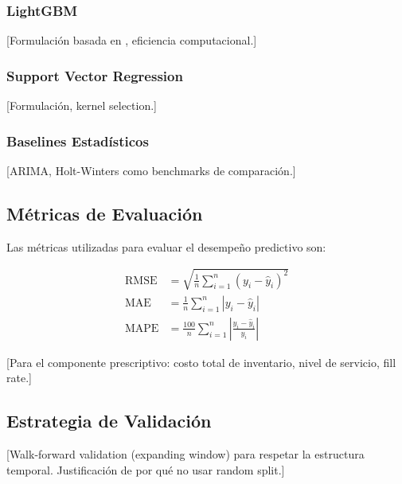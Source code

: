 \subsubsection{LightGBM}
[Formulaci\'{o}n basada en \cite{ke2017lightgbm}, eficiencia computacional.]

\subsubsection{Support Vector Regression}
[Formulaci\'{o}n, kernel selection.]

\subsubsection{Baselines Estad\'{i}sticos}
[ARIMA, Holt-Winters como benchmarks de comparaci\'{o}n.]

\subsection{M\'{e}tricas de Evaluaci\'{o}n}
\label{subsec:metrics}

Las m\'{e}tricas utilizadas para evaluar el desempe\~{n}o predictivo son:

\begin{align}
    \text{RMSE} &= \sqrt{\frac{1}{n}\sum_{i=1}^{n}(y_i - \hat{y}_i)^2} \label{eq:rmse} \\
    \text{MAE}  &= \frac{1}{n}\sum_{i=1}^{n}|y_i - \hat{y}_i| \label{eq:mae} \\
    \text{MAPE} &= \frac{100}{n}\sum_{i=1}^{n}\left|\frac{y_i - \hat{y}_i}{y_i}\right| \label{eq:mape}
\end{align}

[Para el componente prescriptivo: costo total de inventario, nivel de servicio, fill rate.]

\subsection{Estrategia de Validaci\'{o}n}
\label{subsec:validation}

[Walk-forward validation (expanding window) para respetar la estructura temporal. Justificaci\'{o}n de por qu\'{e} no usar random split.]
